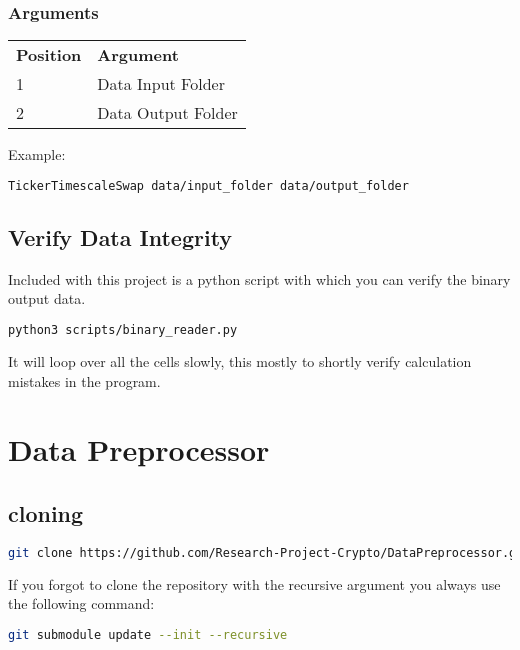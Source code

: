 \documentclass[12pt,a4paper]{article}
\begin{document}
\subsubsection{Arguments}

\begin{table}[H]
\begin{tabular}{ll}
\textbf{Position} & \textbf{Argument}  \\
1                 & Data Input Folder  \\
2                 & Data Output Folder
\end{tabular}
\end{table}

Example:
\begin{lstlisting}[language=bash]
TickerTimescaleSwap data/input_folder data/output_folder
\end{lstlisting}

\subsection{Verify Data Integrity}

Included with this project is a python script with which you can verify the binary output data.

\begin{lstlisting}[language=bash]
python3 scripts/binary_reader.py
\end{lstlisting}

It will loop over all the cells slowly, this mostly to shortly verify calculation mistakes in the program.

\section{Data Preprocessor}

\subsection{cloning}

\begin{lstlisting}[language=bash]
git clone https://github.com/Research-Project-Crypto/DataPreprocessor.git --recursive
\end{lstlisting}

If you forgot to clone the repository with the recursive argument you always use the following command:

\begin{lstlisting}[language=bash]
git submodule update --init --recursive
\end{lstlisting}
\end{document}
